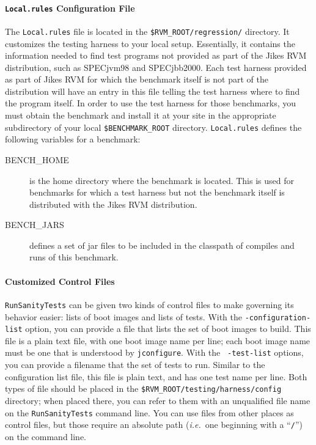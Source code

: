 \paragraph{\texttt{\textbf{Local.rules}} Configuration File}

The {\tt Local.rules} file is located in the 
{\tt \$RVM\_\-ROOT/\-re\-gres\-sion/} directory. 
It customizes the testing harness to your local
setup.  Essentially, it contains the information needed to find test
programs not provided as part of the Jikes RVM distribution, such as
SPECjvm\Rweb{}98 and SPECjbb\Rboth{}2000.  Each test harness
provided as part of Jikes RVM for which the benchmark itself is
not part of the distribution will have an entry in this file telling
the test harness where to find the program itself.  In order to use
the test harness for those benchmarks, you must obtain the benchmark
and install it at your site in the appropriate subdirectory of your
local {\tt \$BENCHMARK\_\-ROOT} directory. {\tt{Local.rules}} defines 
the following variables for a benchmark:
\begin{description}
\item[BENCH\_HOME] is the home directory where the benchmark is
located.  This is used for benchmarks for which a test harness but not
the benchmark itself is distributed with the Jikes RVM distribution. 
\item[BENCH\_JARS] defines a set of jar files to be included in the
classpath of compiles and runs of this benchmark.
\end{description}

\paragraph{Customized Control Files}

\texttt{RunSanityTests} can be given two kinds of control files to make
governing its behavior easier: lists of boot images and lists of
tests.  With the {\tt -con\-fi\-gu\-ra\-tion-list} option, you can provide a
file that lists the set of boot images to build.  This file is a plain
text file, with one boot image name per line; each boot image name
must be one that is understood by \texttt{jconfigure}.  With the {\tt
-test-list} options, you can provide a filename that the set of tests
to run.  Similar to the configuration list file, this file is plain
text, and has one test name per line.  Both types of file should be
placed in the {\tt \$RVM\_\-ROOT/testing/harness/config} directory; when placed
there, you can refer to them with an unqualified file name on the
\texttt{RunSanityTests} command line.  You can use files from other places as
control files, but those require an absolute path ({\it i.e.}\ one beginning
with a ``{\tt /}'') on the command line.


